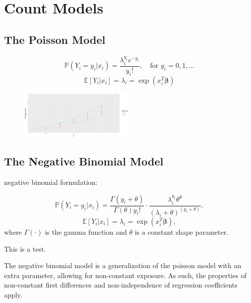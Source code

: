 \documentclass[jou, apacite]{apa6}
\begin{document}
\section{Count Models}

\subsection{The Poisson Model}

\begin{equation} \label{pois1}
\mathbb{P}(Y_i = y_i|x_i) = \dfrac{\lambda_i^{y_i}e^{-y_i}}{y_i!}, \quad\text{for } y_i = 0, 1, \dots
\end{equation}
\begin{equation} \label{pois2}
\mathbb{E}[Y_i|x_i] = \lambda_i = \exp (x_i^T \bm{\beta})
\end{equation}

\begin{figure}[h]
\includegraphics[width=0.5\textwidth]{PoissonFirstDiff.png}
\end{figure}

\subsection{The Negative Binomial Model}

negative binomial formulation:

\begin{equation}
\mathbb{P}(Y_i = y_i | x_i) = \dfrac{\Gamma(y_i + \theta)}{\Gamma(\theta)y_i!}
  \cdot
  \dfrac{\lambda_i^{y_i}\theta^{\theta}}{(\lambda_i + \theta)^{(y_i + \theta)}},
\end{equation}
\begin{equation}
\mathbb{E}[Y_i|x_i] = \lambda_i = \exp (x_i^T \bm{\beta}),
\end{equation}
where $\Gamma(\cdot)$ is the gamma function and $\theta$ is a constant shape parameter.

This is a test.

The negative binomial model is a generalization of the poisson model with an extra parameter, allowing for non-constant exposure. As such, the properties of non-constant first differences and non-independence of regression coefficients apply. 
\end{document}
